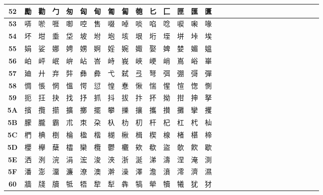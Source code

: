 \begin{table}[H]
\begin{tabular}{|Sc|Sc|Sc|Sc|Sc|Sc|Sc|Sc|Sc|Sc|Sc|Sc|Sc|Sc|Sc|}
\textbf{52} & 勵 & 勸 & 勹 & 匆 & 匈 & 甸 & 匍 & 匐 & 匏 & 匕 & 匚 & 匣 & 匯 & 匱 \\ \hline
\textbf{53} & 哢 & 唹 & 啀 & 啣 & 啌 & 售 & 啜 & 啅 & 啖 & 啗 & 唸 & 唳 & 啝 & 喙 \\ \hline
\textbf{54} & 坏 & 坩 & 埀 & 垈 & 坡 & 坿 & 垉 & 垓 & 垠 & 垳 & 垤 & 垪 & 垰 & 埃 \\ \hline
\textbf{55} & 娟 & 娑 & 娜 & 娉 & 娚 & 婀 & 婬 & 婉 & 娵 & 娶 & 婢 & 婪 & 媚 & 媼 \\ \hline
\textbf{56} & 岶 & 岼 & 岷 & 峅 & 岾 & 峇 & 峙 & 峩 & 峽 & 峺 & 峭 & 嶌 & 峪 & 崋 \\ \hline
\textbf{57} & 廸 & 廾 & 弃 & 弉 & 彝 & 彜 & 弋 & 弑 & 弖 & 弩 & 弭 & 弸 & 彁 & 彈 \\ \hline
\textbf{58} & 惆 & 悵 & 惘 & 慍 & 愕 & 愆 & 惶 & 惷 & 愀 & 惴 & 惺 & 愃 & 愡 & 惻 \\ \hline
\textbf{59} & 扼 & 抂 & 抉 & 找 & 抒 & 抓 & 抖 & 拔 & 抃 & 抔 & 拗 & 拑 & 抻 & 拏 \\ \hline
\textbf{5A} & 擯 & 攬 & 擶 & 擴 & 擲 & 擺 & 攀 & 擽 & 攘 & 攜 & 攅 & 攤 & 攣 & 攫 \\ \hline
\textbf{5B} & 朦 & 朧 & 霸 & 朮 & 朿 & 朶 & 杁 & 朸 & 朷 & 杆 & 杞 & 杠 & 杙 & 杣 \\ \hline
\textbf{5C} & 椚 & 椣 & 椡 & 棆 & 楹 & 楷 & 楜 & 楸 & 楫 & 楔 & 楾 & 楮 & 椹 & 楴 \\ \hline
\textbf{5D} & 櫻 & 欅 & 蘖 & 櫺 & 欒 & 欖 & 鬱 & 欟 & 欸 & 欷 & 盜 & 欹 & 飮 & 歇 \\ \hline
\textbf{5E} & 洒 & 洌 & 浣 & 涓 & 浤 & 浚 & 浹 & 浙 & 涎 & 涕 & 濤 & 涅 & 淹 & 渕 \\ \hline
\textbf{5F} & 潘 & 澎 & 澑 & 濂 & 潦 & 澳 & 澣 & 澡 & 澤 & 澹 & 濆 & 澪 & 濟 & 濕 \\ \hline
\textbf{60} & 牆 & 牋 & 牘 & 牴 & 牾 & 犂 & 犁 & 犇 & 犒 & 犖 & 犢 & 犧 & 犹 & 犲 \\ \hline
\end{tabular}
\end{table}

